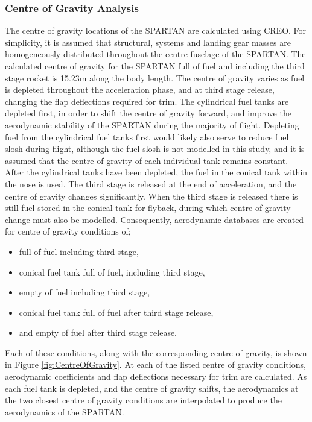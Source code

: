 		\subsubsection{Centre of Gravity Analysis}
		The centre of gravity locations of the SPARTAN are calculated using CREO. For simplicity, it is assumed that structural, systems and landing gear masses are homogeneously distributed throughout the centre fuselage of the SPARTAN. 
		The calculated centre of gravity for the SPARTAN full of fuel and including the third stage rocket is 15.23m along the body length. The centre of gravity varies as fuel is depleted throughout the acceleration phase, and at third stage release, changing the flap deflections required for trim. The cylindrical fuel tanks are depleted first, in order to shift the centre of gravity forward, and improve the aerodynamic stability of the SPARTAN during the majority of flight. Depleting fuel from the cylindrical fuel tanks first would likely also serve to reduce fuel slosh during flight, although the fuel slosh is not modelled in this study, and it is assumed that the centre of gravity of each individual tank remains constant. After the cylindrical tanks have been depleted, the fuel in the conical tank within the nose is used. The third stage is released at the end of acceleration, and the centre of gravity changes significantly. When the third stage is released there is still fuel stored in the conical tank for flyback, during which centre of gravity change must also be modelled. 
		Consequently, aerodynamic databases are created for centre of gravity conditions of; 
		\begin{itemize}
			\item full of fuel including third stage,
			\item conical fuel tank full of fuel, including third stage,
			\item empty of fuel including third stage,
			\item conical fuel tank full of fuel after third stage release,
			\item and empty of fuel after third stage release.
		\end{itemize}
		Each of these conditions, along with the corresponding centre of gravity, is shown in Figure \ref{fig:CentreOfGravity}. At each of the listed centre of gravity conditions, aerodynamic coefficients and flap deflections necessary for trim are calculated.  As each fuel tank is depleted, and the centre of gravity shifts, the aerodynamics at the two closest centre of gravity conditions are interpolated to produce the aerodynamics of the SPARTAN.  
		
